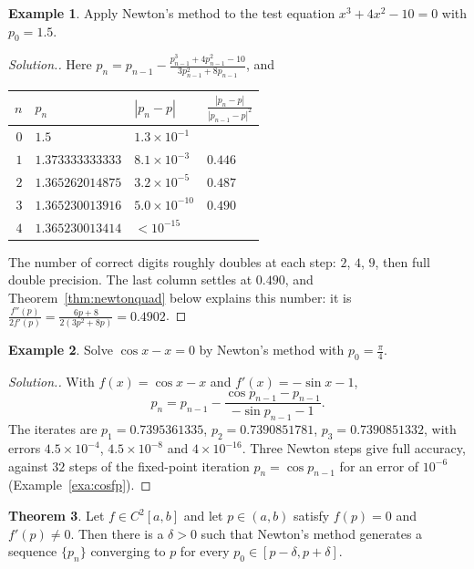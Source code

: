 \documentclass[11pt,a4paper]{article}
\numberwithin{equation}{section}
\theoremstyle{definition}
\newtheorem{thm}{Theorem}[subsection]
\newtheorem{exa}[thm]{Example}
\newenvironment{solution}
  {\renewcommand{\qedsymbol}{}\begin{proof}[\textit{Solution}.]}
  {\end{proof}}
\begin{document}
\begin{exa}
\label{exa:newtontest}
Apply Newton's method to the test equation $x^3+4x^2-10 = 0$ with $p_0 = 1.5$.
\end{exa}

\begin{solution}
Here $p_n = p_{n-1}-\frac{p_{n-1}^3+4p_{n-1}^2-10}{3p_{n-1}^2+8p_{n-1}}$, and
\begin{center}
\begin{tabular}{rlll}
\hline
$n$ & $p_n$ & $|p_n-p|$ & $\frac{|p_n-p|}{|p_{n-1}-p|^2}$\\
\hline
$0$ & $1.5$ & $1.3\times10^{-1}$ & \\
$1$ & $1.373333333333$ & $8.1\times10^{-3}$ & $0.446$\\
$2$ & $1.365262014875$ & $3.2\times10^{-5}$ & $0.487$\\
$3$ & $1.365230013916$ & $5.0\times10^{-10}$ & $0.490$\\
$4$ & $1.365230013414$ & $<10^{-15}$ & \\
\hline
\end{tabular}
\end{center}
The number of correct digits roughly doubles at each step: $2$, $4$, $9$, then full double precision. The last column settles at
$0.490$, and Theorem~\ref{thm:newtonquad} below explains this number: it is $\frac{f''(p)}{2f'(p)} = \frac{6p+8}{2(3p^2+8p)} = 0.4902$.
\end{solution}

\begin{exa}
\label{exa:newtoncos}
Solve $\cos x - x = 0$ by Newton's method with $p_0 = \frac{\pi}{4}$.
\end{exa}

\begin{solution}
With $f(x) = \cos x-x$ and $f'(x) = -\sin x-1$,
$$p_n = p_{n-1}-\frac{\cos p_{n-1}-p_{n-1}}{-\sin p_{n-1}-1}.$$
The iterates are $p_1 = 0.7395361335$, $p_2 = 0.7390851781$, $p_3 = 0.7390851332$, with errors $4.5\times10^{-4}$, $4.5\times10^{-8}$ and
$4\times10^{-16}$. Three Newton steps give full accuracy, against $32$ steps of the fixed-point iteration $p_n = \cos p_{n-1}$ for an error
of $10^{-6}$ (Example~\ref{exa:cosfp}).
\end{solution}

\begin{thm}
\label{thm:newtonconv}
Let $f\in C^2[a,b]$ and let $p\in(a,b)$ satisfy $f(p) = 0$ and $f'(p)\neq0$. Then there is a $\delta>0$ such that Newton's method
generates a sequence $\{p_n\}$ converging to $p$ for every $p_0\in[p-\delta,p+\delta]$.
\end{thm}
\end{document}
